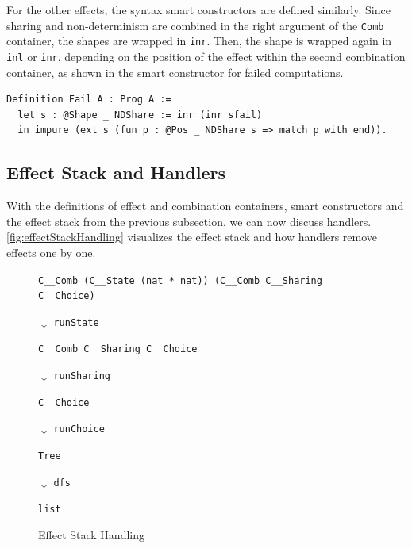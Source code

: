 \documentclass[a4paper, 11pt, fleqn, twoside]{scrreprt}
\newcommand{\cinl}[1]{\texttt{#1}}
\begin{document}
For the other effects, the syntax smart constructors are defined similarly.
Since sharing and non-determinism are combined in the right argument of the \cinl{Comb} container, the shapes are wrapped in \cinl{inr}.
Then, the shape is wrapped again in \cinl{inl} or \cinl{inr}, depending on the position of the effect within the second combination container, as shown in the smart constructor for failed computations.

\begin{verbatim}
Definition Fail A : Prog A :=
  let s : @Shape _ NDShare := inr (inr sfail)
  in impure (ext s (fun p : @Pos _ NDShare s => match p with end)).
\end{verbatim}

\subsection{Effect Stack and Handlers}
\label{subsec:effectstack}

With the definitions of effect and combination containers, smart constructors and the effect stack from the previous subsection, we can now discuss handlers.
\autoref{fig:effectStackHandling} visualizes the effect stack and how handlers remove effects one by one.

\begin{figure}[H]
{\centering \cinl{C__Comb (C__State (nat * nat)) (C__Comb C__Sharing C__Choice)} \par}

\hspace*{.48\textwidth} {\Large \boldmath $\downarrow$} \texttt{runState}

{\centering \cinl{C__Comb C__Sharing C__Choice} \par}

\hspace*{.48\textwidth} {\Large \boldmath $\downarrow$} \texttt{runSharing}

{\centering \cinl{C__Choice} \par}

\hspace*{.48\textwidth} {\Large \boldmath $\downarrow$} \texttt{runChoice}

{\centering \cinl{Tree} \par}

\hspace*{.48\textwidth} {\Large \boldmath $\downarrow$} \texttt{dfs}

{\centering \cinl{list} \par}
\caption{Effect Stack Handling}
\label{fig:effectStackHandling}
\end{figure}
\end{document}
